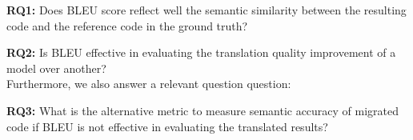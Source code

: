{\bf RQ1:} Does BLEU score reflect well the semantic similarity between
the resulting code and the reference code in the ground truth?

{\bf RQ2:} Is BLEU effective in evaluating the translation quality 
improvement of a model over another?\\
Furthermore, we also answer a relevant question question:

{\bf RQ3:} What is the alternative metric to measure semantic accuracy
of migrated code if BLEU is not effective in evaluating the translated results?
